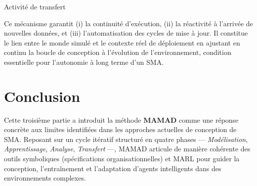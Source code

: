 \vspace{-0.3em}
\begin{algorithm}[H]
    \caption{Activité de transfert}
    \label{alg:transferring}
    \DontPrintSemicolon

    \vspace{0.3em}
\end{algorithm}

Ce mécanisme garantit (i) la continuité d'exécution, (ii) la réactivité à l'arrivée de nouvelles données, et (iii) l'automatisation des cycles de mise à jour. Il constitue le lien entre le monde simulé et le contexte réel de déploiement en ajustant en continu la boucle de conception à l'évolution de l'environnement, condition essentielle pour l'autonomie à long terme d'un \ac{SMA}.



\chapter*{Conclusion}

\noindent
Cette troisième partie a introduit la méthode \textbf{\ac{MAMAD}} comme une réponse concrète aux limites identifiées dans les approches actuelles de conception de \ac{SMA}. Reposant sur un cycle itératif structuré en quatre phases — \textit{Modélisation}, \textit{Apprentissage}, \textit{Analyse}, \textit{Transfert} —, \ac{MAMAD} articule de manière cohérente des outils symboliques (spécifications organisationnelles) et \ac{MARL} pour guider la conception, l'entraînement et l'adaptation d'agents intelligents dans des environnements complexes.

